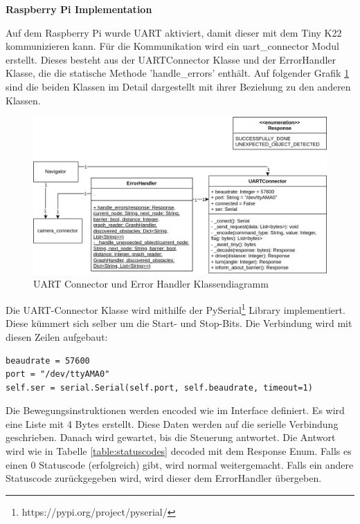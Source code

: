 \textbf{Raspberry Pi Implementation}

Auf dem Raspberry Pi wurde UART aktiviert, damit dieser mit dem Tiny K22 kommunizieren kann.
Für die Kommunikation wird ein uart\_connector Modul erstellt. Dieses besteht aus der UARTConnector Klasse und der ErrorHandler Klasse, die die statische Methode 'handle\_errors' enthält. Auf folgender Grafik \ref{fig:uart-connector-nav} sind die beiden Klassen im Detail dargestellt mit ihrer Beziehung zu den anderen Klassen.

\begin{figure}[H]
\centering
\includegraphics[width=\textwidth]{assets/IT/robot-sw-architecture-uart-connector.png}
\caption{UART Connector und Error Handler Klassendiagramm}
\label{fig:uart-connector-nav}
\end{figure}

Die UART-Connector Klasse  wird mithilfe der PySerial\footnote{https://pypi.org/project/pyserial/} Library implementiert. Diese kümmert sich selber um die Start- und Stop-Bits.
Die Verbindung wird mit diesen Zeilen aufgebaut:

\begin{verbatim}
beaudrate = 57600
port = "/dev/ttyAMA0"
self.ser = serial.Serial(self.port, self.beaudrate, timeout=1)
\end{verbatim}

Die Bewegungsinstruktionen werden encoded wie im Interface definiert. Es wird eine Liste mit 4 Bytes erstellt.
Diese Daten werden auf die serielle Verbindung geschrieben.
Danach wird gewartet, bis die Steuerung antwortet. Die Antwort wird wie in Tabelle \ref{table:statuscodes} decoded mit dem Response Enum.
Falls es einen 0 Statuscode (erfolgreich) gibt, wird normal weitergemacht. Falls ein andere Statuscode zurückgegeben wird, wird dieser dem ErrorHandler übergeben.

